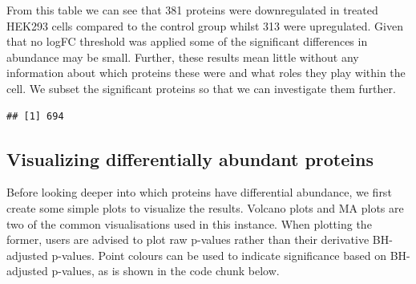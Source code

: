 \documentclass[9pt,a4paper,]{extarticle}
\newenvironment{Shaded}{\begin{snugshade}}{\end{snugshade}}
\newcommand{\DocumentationTok}[1]{\textcolor[rgb]{0.56,0.35,0.01}{\textbf{\textit{#1}}}}
\newcommand{\FloatTok}[1]{\textcolor[rgb]{0.00,0.00,0.81}{#1}}
\newcommand{\FunctionTok}[1]{\textcolor[rgb]{0.13,0.29,0.53}{\textbf{#1}}}
\newcommand{\NormalTok}[1]{#1}
\newcommand{\OtherTok}[1]{\textcolor[rgb]{0.56,0.35,0.01}{#1}}
\newcommand{\SpecialCharTok}[1]{\textcolor[rgb]{0.81,0.36,0.00}{\textbf{#1}}}
\begin{document}
From this table we can see that 381 proteins were downregulated
in treated HEK293 cells compared to the control group whilst 313
were upregulated. Given that no logFC threshold was applied some of the significant
differences in abundance may be small. Further, these results mean little without
any information about which proteins these were and what roles they play within
the cell. We subset the significant proteins so that we can investigate them
further.

\begin{Shaded}
\end{Shaded}

\begin{verbatim}
## [1] 694
\end{verbatim}

\subsection{Visualizing differentially abundant proteins}\label{visualizing-differentially-abundant-proteins}

Before looking deeper into which proteins have differential abundance, we first
create some simple plots to visualize the results. Volcano plots and MA plots
are two of the common visualisations used in this instance. When plotting the
former, users are advised to plot raw p-values rather than their derivative
BH-adjusted p-values. Point colours can be used to indicate significance based
on BH- adjusted p-values, as is shown in the code chunk below.
\end{document}
